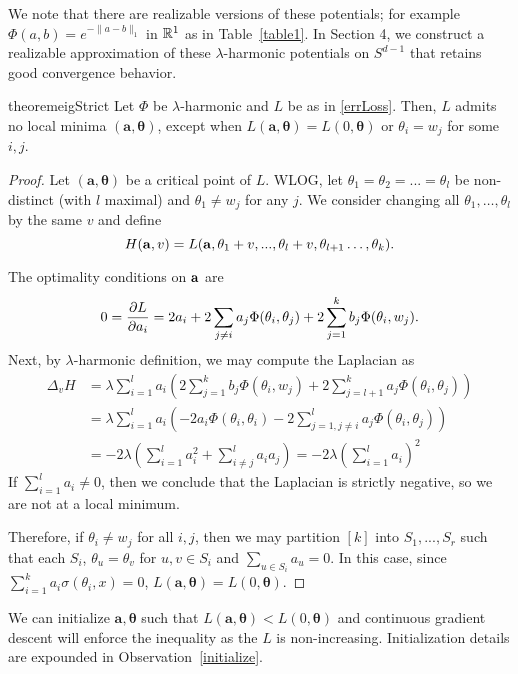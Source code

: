 We note that there are realizable versions of these potentials; for
example $\Phi(a,b) = e^{-\|a-b\|_1}$ in ${\mathbb{R}}^1$ as in Table~\ref{table1}. In Section 4, we construct a realizable approximation of these $\lambda$-harmonic potentials on $S^{d-1}$ that retains good convergence behavior.
%
\begin{restatable}{theorem}{eigStrict}
\label{EigStrict}
Let $\Phi$ be $\lambda$-harmonic and $L$ be as in \ref{errLoss}. Then,
$L$ admits no local minima $\boldsymbol{(a,\theta)}$, except when
$L(\boldsymbol{a,\theta}) = L(0,\boldsymbol{\theta})$ or $\theta_i = w_j$ for some $i,j$. 
\end{restatable}
\begin{proof}
  Let $(\boldsymbol{a,\theta})$ be a critical point of $L$. WLOG, let $\theta_1 = \theta_2 =... = \theta_l$ be non-distinct (with $l$ maximal) and $\theta_1 \neq w_j$ for any $j$. We consider changing all
$\theta_1, \ldots, \theta_{l}$ by the same $v$ and define 
%
\[H({\bf a}, v) = L({\bf a},\theta_1+v,...,\theta_l+v, \theta_{l+1}
\ldots, \theta_k).\]

The optimality conditions on ${\bf a}$ are 
\begin{align*}
0 = \frac{\partial L}{\partial a_i} = 2a_i  + 2\sum_{j\neq i} a_j \Phi(\theta_i,\theta_j)
  + 2\sum_{j=1}^k b_j \Phi(\theta_i,w_j).
\end{align*}
%
Next, by $\lambda$-harmonic definition, we may compute the Laplacian as 
\begin{align*}
\Delta_v H & = \lambda\sum_{i=1}^l a_i \left(2\sum_{j=1}^k b_j
  \Phi(\theta_i, w_j) + 2\sum_{j=l+1}^k a_j
  \Phi(\theta_i, \theta_j)\right) \\
& = \lambda\sum_{i=1}^l a_i \left(-2a_i\Phi(\theta_i, \theta_i) - 2
  \sum_{j = 1, j\neq i}^l  a_j \Phi(\theta_i,\theta_j)\right) \\
%
%
& = -2\lambda\left(\sum_{i=1}^l a_i^2
  +\sum_{i \neq j}^l a_i a_j \right) = -2 \lambda\left(\sum_{i=1}^l a_i\right)^2
\end{align*} 
%
If $\sum_{i=1}^l a_i \neq 0$, then we conclude that the Laplacian is
strictly negative, so we are not at a local minimum. 

Therefore, if $\theta_i \neq w_j$ for all $i,j$, then we may partition $[k]$ into $S_1,...,S_r$ such that each $S_i$, $\theta_{u} = \theta_v$
for $u, v \in S_i$ and $\sum_{u \in S_i} a_u = 0$. In this case, since $\sum_{i=1}^k a_i \sigma(\theta_i,x) = 0$, $L(\boldsymbol{a,\theta}) = L(0,\boldsymbol{\theta})$. 
\end{proof} 
%
\begin{observation}
We can initialize $\boldsymbol{a,\theta}$ such that $L(\boldsymbol{a,\theta}) < L(0,\boldsymbol{\theta})$ and continuous gradient descent will enforce the inequality as the $L$ is non-increasing. Initialization details are expounded in Observation~\ref{initialize}.
\end{observation}
%

